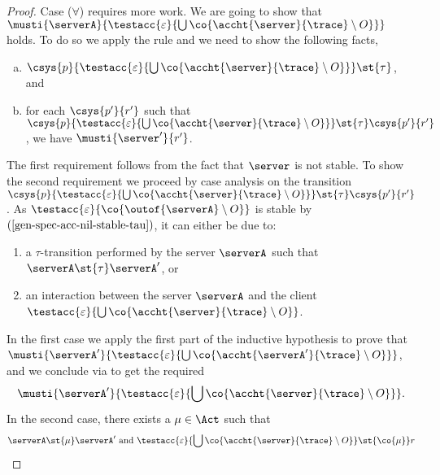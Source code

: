 {\begin{proof}
  Case ($\forall$) requires more work.
  We are going to show that $\musti{\serverA}{\testacc{\varepsilon}{\bigcup \co{\accht{ \server }{ \trace } \setminus O}}}$ holds.
  To do so we apply the rule \mstep and we need to show the following facts,
  \begin{enumerate}[(a)]
  \item $\csys{ p }{\testacc{\varepsilon}{\bigcup \co{\accht{ \server }{ \trace } \setminus O}}} \st{\tau}$, and
  \item for each $\csys{p'}{r'}$ such that
    $\csys{ p }{\testacc{\varepsilon}{\bigcup \co{\accht{ \server }{ \trace } \setminus O}}}
    \st{\tau} \csys{p'}{r'}$, we have $\musti{\server'}{r'}$.
  \end{enumerate}

  The first requirement follows from the fact that $\server$ is not
  stable. %
  To show the second requirement we proceed by case analysis on the transition
  $\csys{ p }{\testacc{\varepsilon}{\bigcup \co{\accht{ \server }{ \trace } \setminus O}}} \st{\tau} \csys{p'}{r'}$.
  As $\testacc{\varepsilon}{\co{ \outof{\serverA} \setminus O }}$ is stable by
  $(\ref{gen-spec-acc-nil-stable-tau})$, it can either be due to:
  \begin{enumerate}
  \item a $\tau$-transition performed by the server $\serverA$ such that
    $\serverA \st{\tau} \serverA'$, or
  \item an interaction between the server $\serverA$ and the client
    $\testacc{\varepsilon}{\bigcup \co{\accht{ \server }{ \trace } \setminus O}}$.
  \end{enumerate}

  In the first case we apply the first part of the inductive hypothesis %
  to prove that 
  $\musti{\serverA'}{\testacc{\varepsilon}{\bigcup \co{\accht{ \serverA' }{ \trace } \setminus O}}}$,
  and we conclude via  to get the required
  $$
  \musti{\serverA'}{\testacc{\varepsilon}{\bigcup \co{\accht{ \server }{ \trace } \setminus O}}}.
  $$
  In the second case, there exists a $\mu \in \Act$ such that
  $$
  \serverA \st{\mu} \serverA' \text{ and }
  \testacc{\varepsilon}{\bigcup \co{\accht{ \server }{ \trace } \setminus O}} \st{\co{\mu}} r
  $$


\end{proof}}
